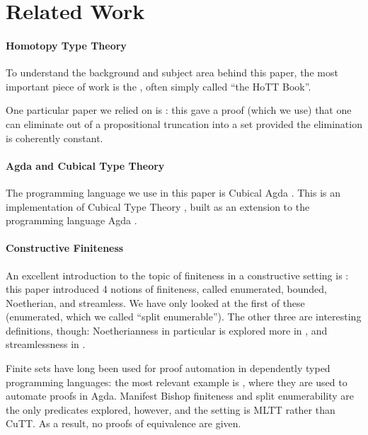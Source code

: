 \section{Related Work}
\paragraph{Homotopy Type Theory}
To understand the background and subject area behind this paper, the most
important piece of work is the \citet{hottbook}, often simply called ``the HoTT
Book''.

One particular paper we relied on is \citet{krausGeneralUniversalProperty2015}:
this gave a proof (which we use) that one can eliminate out of a propositional
truncation into a set provided the elimination is coherently constant.
\paragraph{Agda and Cubical Type Theory}
The programming language we use in this paper is Cubical Agda
\cite{vezzosiCubicalAgdaDependently2019}.
This is an implementation of Cubical Type Theory
\cite{cohenCubicalTypeTheory2016}, built as an extension to the programming
language Agda \cite{norellDependentlyTypedProgramming2008}.
\paragraph{Constructive Finiteness}
An excellent introduction to the topic of finiteness in a constructive setting
is \citet{coquandConstructivelyFinite2010}: this paper introduced 4 notions of
finiteness, called enumerated, bounded, Noetherian, and streamless.
We have only looked at the first of these (enumerated, which we called ``split
enumerable'').
The other three are interesting definitions, though: Noetherianness in
particular is explored more in \citet{firsovVariationsNoetherianness2016}, and
streamlessness in \citet{parmannInvestigatingStreamlessSets2015}.

Finite sets have long been used for proof automation in dependently typed
programming languages: the most relevant example is
\citet{firsovDependentlyTypedProgramming2015}, where they are used to automate
proofs in Agda.
Manifest Bishop finiteness and split enumerability are the only predicates
explored, however, and the setting is MLTT rather than CuTT.
As a result, no proofs of equivalence are given.

